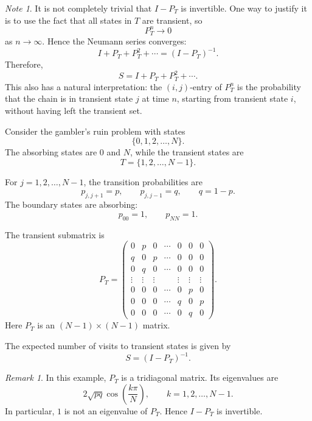 \documentclass[11pt]{article}
\theoremstyle{plain}
\theoremstyle{definition}
\theoremstyle{remark}
\newtheorem{remark}[theorem]{Remark}
\newtheorem{note}[theorem]{Note}
\begin{document}
	\begin{note}
		It is not completely trivial that \(I-P_T\) is invertible. One way to justify it is to use the fact that all states in \(T\) are transient, so
		\[
		P_T^n\to 0
		\]
		as \(n\to\infty\). Hence the Neumann series converges:
		\[
		I+P_T+P_T^2+\cdots=(I-P_T)^{-1}.
		\]
		Therefore,
		\[
		S=I+P_T+P_T^2+\cdots.
		\]
		This also has a natural interpretation: the \((i,j)\)-entry of \(P_T^n\) is the probability that the chain is in transient state \(j\) at time \(n\), starting from transient state \(i\), without having left the transient set.
	\end{note}
	
	
	
	
	
	Consider the gambler's ruin problem with states
	\[
	\{0,1,2,\dots,N\}.
	\]
	The absorbing states are \(0\) and \(N\), while the transient states are
	\[
	T=\{1,2,\dots,N-1\}.
	\]
	
	For \(j=1,2,\dots,N-1\), the transition probabilities are
	\[
	p_{j,j+1}=p,
	\qquad
	p_{j,j-1}=q,
	\qquad
	q=1-p.
	\]
	The boundary states are absorbing:
	\[
	p_{00}=1,
	\qquad
	p_{NN}=1.
	\]
	
	The transient submatrix is
	\[
	P_T=
	\begin{pmatrix}
		0      & p      & 0      & \cdots & 0      & 0      & 0      \\
		q      & 0      & p      & \cdots & 0      & 0      & 0      \\
		0      & q      & 0      & \cdots & 0      & 0      & 0      \\
		\vdots & \vdots & \vdots &        & \vdots & \vdots & \vdots \\
		0      & 0      & 0      & \cdots & 0      & p      & 0      \\
		0      & 0      & 0      & \cdots & q      & 0      & p      \\
		0      & 0      & 0      & \cdots & 0      & q      & 0
	\end{pmatrix}.
	\]
	Here \(P_T\) is an \((N-1)\times (N-1)\) matrix.
	
	The expected number of visits to transient states is given by
	\[
	S=(I-P_T)^{-1}.
	\]
	
	\begin{remark}
		In this example, \(P_T\) is a tridiagonal matrix. Its eigenvalues are
		\[
		2\sqrt{pq}\cos\left(\frac{k\pi}{N}\right),
		\qquad
		k=1,2,\dots,N-1.
		\]
		In particular, \(1\) is not an eigenvalue of \(P_T\). Hence \(I-P_T\) is invertible.
	\end{remark}
	
\end{document}
